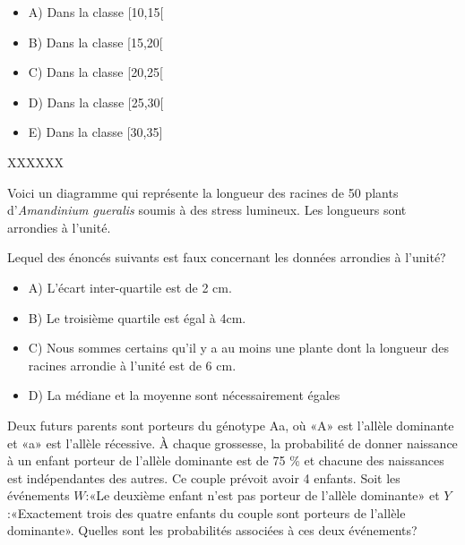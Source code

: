 \begin{questions}
	\begin{itemize}[label = {}]
		\item A) Dans la classe [10,15[
		\item B) Dans la classe [15,20[
		\item C) Dans la classe [20,25[
		\item D) Dans la classe [25,30[
		\item E) Dans la classe [30,35]
	\end{itemize}
 


\begin{solution}
XXXXXX
\end{solution}

\newpage
\question[3] Voici un diagramme qui représente la longueur des racines de 50 plants d'\textit{Amandinium gueralis} soumis à des stress lumineux. Les longueurs sont arrondies à l'unité.


Lequel des énoncés suivants est faux concernant les données arrondies à l'unité?
	\begin{itemize}[label = {}]
		\item A) L'écart inter-quartile est de 2 cm.
		\item B) Le troisième quartile est égal à 4cm.
		\item C) Nous sommes certains qu'il y a au moins une plante dont la longueur des racines arrondie à l'unité est de 6 cm.
		\item D) La médiane et la moyenne sont nécessairement égales
	\end{itemize}
 

\begin{solution}

\end{solution}

\question[3] Deux futurs parents sont porteurs du génotype Aa, où «A» est l'allèle dominante et «a» est l'allèle récessive. À chaque grossesse, la probabilité de donner naissance à un enfant porteur de l'allèle dominante est de 75 \% et chacune des naissances est indépendantes des autres. Ce couple prévoit avoir 4 enfants. Soit les événements $W$:«Le deuxième enfant n'est pas porteur de l'allèle dominante» et $Y$:«Exactement trois des quatre enfants du couple sont porteurs de l'allèle dominante». Quelles sont les probabilités associées à ces deux événements?


\end{questions}
